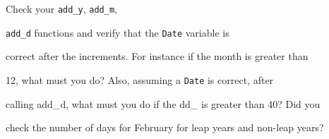 Check your \texttt{add\_y}, \texttt{add\_m},

\texttt{add\_d} functions and verify that the \texttt{Date} variable is

correct after the increments. For instance if the month is greater than

12, what must you do? Also, assuming a \texttt{Date} is correct, after

calling add\_d, what must you do if the dd\_ is greater than 40? Did you

check the number of days for February for leap years and non-leap years?

